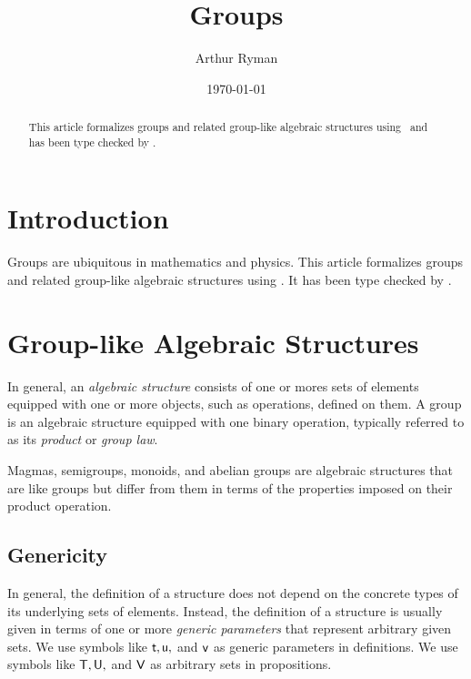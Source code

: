 \documentclass{amsart}
\begin{document}
\title{Groups}
\author{Arthur Ryman}
\date{\today}

\begin{abstract}
	This article formalizes groups and related group-like algebraic structures using 
	\ZN\ and has been type checked by \fuzz.
\end{abstract}

\maketitle

\tableofcontents

\section{Introduction}

Groups are ubiquitous in mathematics and physics.
This article formalizes groups and related group-like algebraic structures using 
\ZN\cite{spivey-zrm}.
It has been type checked by \fuzz\cite{spivey-fm}.

\section{Group-like Algebraic Structures}

In general, an \textit{algebraic structure} consists of one or mores sets of elements 
equipped with one or more objects, such as operations, defined on them.
A group is an algebraic structure equipped with one binary operation, typically referred to
as its \textit{product} or \textit{group law}.

Magmas, semigroups, monoids, and abelian groups are 
algebraic structures that are like groups but differ from them 
in terms of the properties imposed on their product operation.

\subsection{Genericity}

In general, the definition of a structure does not depend on the concrete types
of its underlying sets of elements.
Instead, the definition of a structure is usually given in terms of one or more \textit{generic parameters}
that represent arbitrary given sets.
We use symbols like $\mathsf{t}, \mathsf{u},$  and $\mathsf{v}$ as generic parameters in definitions. 
We use symbols like $\mathsf{T}, \mathsf{U},$ and $\mathsf{V}$ as arbitrary sets in propositions.
\end{document}
